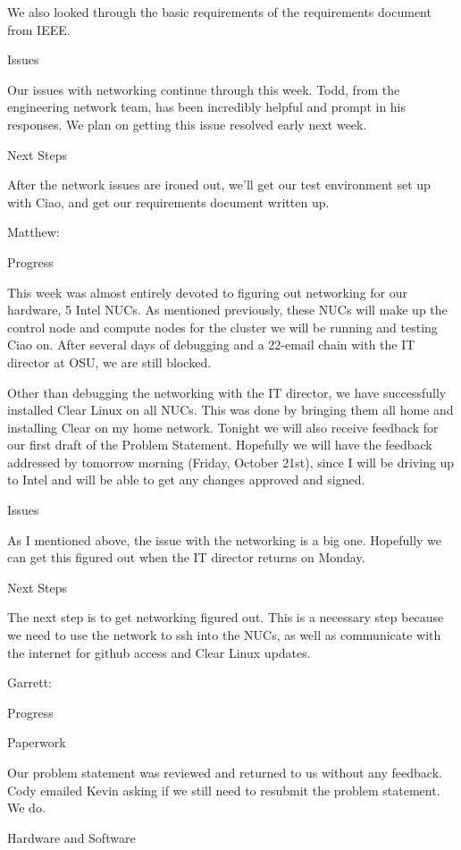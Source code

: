 \documentclass[10pt,onecolumn,journal,draftclsnofoot]{IEEEtran}
\begin{document}
We also looked through the basic requirements of the requirements document from
IEEE.

Issues

Our issues with networking continue through this week. Todd, from the
engineering network team, has been incredibly helpful and prompt in his
responses. We plan on getting this issue resolved early next week.

Next Steps

After the network issues are ironed out, we'll get our test environment set up
with Ciao, and get our requirements document written up.

Matthew:

Progress

This week was almost entirely devoted to figuring out networking for our
hardware, 5 Intel NUCs. As mentioned previously, these NUCs will make up the
control node and compute nodes for the cluster we will be running and testing
Ciao on. After several days of debugging and a 22-email chain with the IT
director at OSU, we are still blocked.


Other than debugging the networking with the IT director, we have successfully
installed Clear Linux on all NUCs. This was done by bringing them all home and
installing Clear on my home network. Tonight we will also receive feedback for
our first draft of the Problem Statement. Hopefully we will have the feedback
addressed by tomorrow morning (Friday, October 21st), since I will be driving up
to Intel and will be able to get any changes approved and signed.

Issues

As I mentioned above, the issue with the networking is a big one. Hopefully we
can get this figured out when the IT director returns on Monday.

Next Steps

The next step is to get networking figured out. This is a necessary step because
we need to use the network to ssh into the NUCs, as well as communicate with the
internet for github access and Clear Linux updates.

Garrett:

Progress

Paperwork

Our problem statement was reviewed and returned to us without any feedback. Cody
emailed Kevin asking if we still need to resubmit the problem statement. We do.

Hardware and Software
\end{document}
